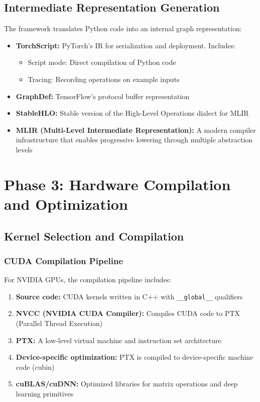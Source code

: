 \documentclass[11pt]{article}
\begin{document}
\subsection{Intermediate Representation Generation}
The framework translates Python code into an internal graph representation:

\begin{itemize}
    \item \textbf{TorchScript:} PyTorch's IR for serialization and deployment. Includes:
    \begin{itemize}
        \item Script mode: Direct compilation of Python code
        \item Tracing: Recording operations on example inputs
    \end{itemize}
    
    \item \textbf{GraphDef:} TensorFlow's protocol buffer representation
    
    \item \textbf{StableHLO:} Stable version of the High-Level Operations dialect for MLIR
    
    \item \textbf{MLIR (Multi-Level Intermediate Representation):} A modern compiler infrastructure that enables progressive lowering through multiple abstraction levels
\end{itemize}

\section{Phase 3: Hardware Compilation and Optimization}

\subsection{Kernel Selection and Compilation}

\subsubsection{CUDA Compilation Pipeline}
For NVIDIA GPUs, the compilation pipeline includes:

\begin{enumerate}
    \item \textbf{Source code:} CUDA kernels written in C++ with \texttt{\_\_global\_\_} qualifiers
    \item \textbf{NVCC (NVIDIA CUDA Compiler):} Compiles CUDA code to PTX (Parallel Thread Execution)
    \item \textbf{PTX:} A low-level virtual machine and instruction set architecture
    \item \textbf{Device-specific optimization:} PTX is compiled to device-specific machine code (cubin)
    \item \textbf{cuBLAS/cuDNN:} Optimized libraries for matrix operations and deep learning primitives
\end{enumerate}
\end{document}
